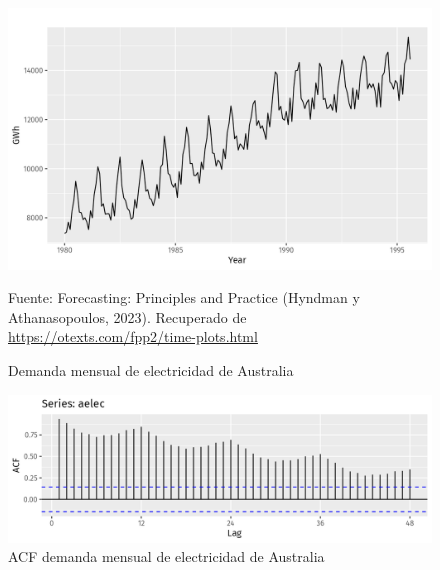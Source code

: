 \begin{itemize}
    \begin{figure}[H]
        \begin{minipage}[t]{0.9\textwidth}
            \caption{Demanda mensual de electricidad de Australia}
            \label{autocorrelaciones3}        
        \end{minipage}
    
        \vspace{10pt}
    
        \begin{minipage}[b]{0.9\textwidth}
            \centering
            \includegraphics[width=\textwidth]{img/aelec-1-ejemplo.png}        
        \end{minipage}
    
        \begin{minipage}[t]{0.9\textwidth}
            Fuente: Forecasting: Principles and Practice (Hyndman y Athanasopoulos, 2023). Recuperado de \url{https://otexts.com/fpp2/time-plots.html}
        \end{minipage}
    \end{figure}

    \begin{figure}[H]
        \begin{minipage}[t]{0.9\textwidth}
            \caption{ACF demanda mensual de electricidad de Australia}
            \label{autocorrelaciones4}        
        \end{minipage}
    
        \vspace{10pt}
    
        \begin{minipage}[b]{0.9\textwidth}
            \centering
            \includegraphics[width=\textwidth]{img/acfelec-1-ejemplo.png}        
        \end{minipage}
    

\end{figure}
\end{itemize}
